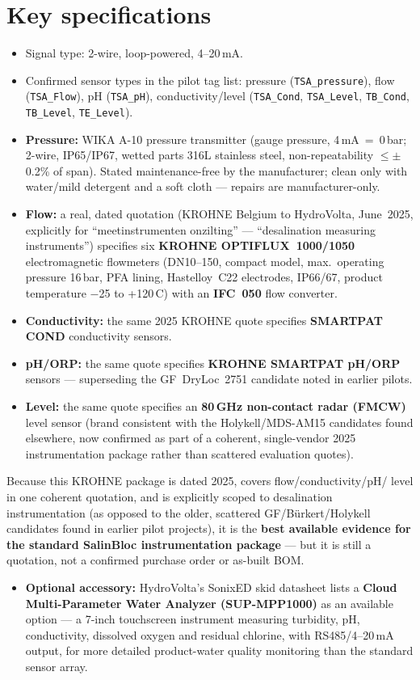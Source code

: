 \documentclass[a4paper,11pt,twoside,openright,numbers=noenddot]{scrreprt}
\newcommand{\plctag}[1]{\texttt{\small #1}}
\newcommand{\salinbloc}{SalinBloc\texttrademark\xspace}
\begin{document}
\section{Key specifications}
\begin{itemize}
\item Signal type: 2-wire, loop-powered, 4--20\,mA.
\item Confirmed sensor types in the pilot tag list: pressure
  (\plctag{TSA\_pressure}), flow (\plctag{TSA\_Flow}), pH
  (\plctag{TSA\_pH}), conductivity/level (\plctag{TSA\_Cond},
  \plctag{TSA\_Level}, \plctag{TB\_Cond}, \plctag{TB\_Level},
  \plctag{TE\_Level}).
\item \textbf{Pressure:} WIKA A-10 pressure transmitter (gauge pressure,
  4\,mA~=~0\,bar; 2-wire, IP65/IP67, wetted parts 316L stainless steel,
  non-repeatability $\leq\pm$0.2\% of span). Stated maintenance-free by
  the manufacturer; clean only with water/mild detergent and a soft cloth
  --- repairs are manufacturer-only.
\item \textbf{Flow:} a real, dated quotation (KROHNE Belgium to
  HydroVolta, June~2025, explicitly for \enquote{meetinstrumenten
  onzilting} --- \enquote{desalination measuring instruments}) specifies
  six \textbf{KROHNE OPTIFLUX~1000/1050} electromagnetic flowmeters
  (DN10--150, compact model, max.\ operating pressure 16\,bar, PFA
  lining, Hastelloy~C22 electrodes, IP66/67, product temperature
  $-$25 to +120\,\textdegree C) with an \textbf{IFC~050} flow converter.
\item \textbf{Conductivity:} the same 2025 KROHNE quote specifies
  \textbf{SMARTPAT COND} conductivity sensors.
\item \textbf{pH/ORP:} the same quote specifies \textbf{KROHNE SMARTPAT
  pH/ORP} sensors --- superseding the GF~DryLoc~2751 candidate noted in
  earlier pilots.
\item \textbf{Level:} the same quote specifies an \textbf{80\,GHz
  non-contact radar (FMCW)} level sensor (brand consistent with the
  Holykell/MDS-AM15 candidates found elsewhere, now confirmed as part of
  a coherent, single-vendor 2025 instrumentation package rather than
  scattered evaluation quotes).
\end{itemize}
Because this KROHNE package is dated 2025, covers flow/conductivity/pH/
level in one coherent quotation, and is explicitly scoped to desalination
instrumentation (as opposed to the older, scattered
GF/B\"urkert/Holykell candidates found in earlier pilot projects), it is
the \textbf{best available evidence for the standard \salinbloc
instrumentation package} --- but it is still a quotation, not a
confirmed purchase order or as-built BOM.
\begin{itemize}
\item \textbf{Optional accessory:} HydroVolta's SonixED skid datasheet
  lists a \textbf{Cloud Multi-Parameter Water Analyzer (SUP-MPP1000)} as
  an available option --- a 7-inch touchscreen instrument measuring
  turbidity, pH, conductivity, dissolved oxygen and residual chlorine,
  with RS485/4--20\,mA output, for more detailed product-water quality
  monitoring than the standard sensor array.
\end{itemize}
\end{document}
